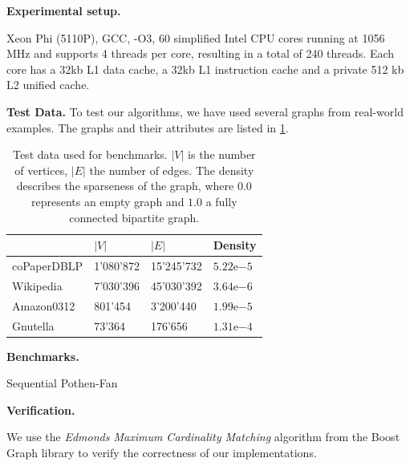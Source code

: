 \documentclass[letterpaper]{article}
\newcommand{\mypar}[1]{{\bf #1.}}
\begin{document}

\mypar{Experimental setup} 

Xeon Phi (5110P), GCC, -O3, 60 simplified Intel CPU cores running at 1056 MHz and supports 4 threads per core, resulting in a total of 240 threads. Each core has a 32kb L1 data cache, a 32kb L1 instruction cache and a private 512 kb L2 unified cache. \cite{Ramos:2013}

\mypar{Test Data}
To test our algorithms, we have used several graphs from real-world examples. The graphs and their attributes are listed in \ref{table:testdata}. \\
\begin{table}
\centering
\begin{tabular}{ |l|l|l|l| }
\hline
 & $\lvert V \rvert$ & $\lvert E \rvert$ & Density \\ \hline
coPaperDBLP & 1'080'872 & 15'245'732 & $5.22\mathrm{e}{-5}$ \\ \hline
Wikipedia & 7'030'396 & 45'030'392 & $3.64\mathrm{e}{-6}$ \\ \hline
Amazon0312 & 801'454 & 3'200'440 & $1.99\mathrm{e}{-5}$ \\ \hline
Gnutella & 73'364 & 176'656 & $1.31\mathrm{e}{-4}$ \\ \hline
\end{tabular}
\caption{Test data used for benchmarks. $\lvert V \rvert$ is the number of vertices, $\lvert E \rvert$ the number of edges. The density describes the sparseness of the graph, where $0.0$ represents an empty graph and $1.0$ a fully connected bipartite graph.}
\label{table:testdata}
\end{table}
\mypar{Benchmarks}

Sequential Pothen-Fan

\mypar{Verification}

We use the \textit{Edmonds Maximum Cardinality Matching} algorithm \cite{BoostEdmonds} from the Boost Graph library  to verify the correctness of our implementations.
\end{document}
